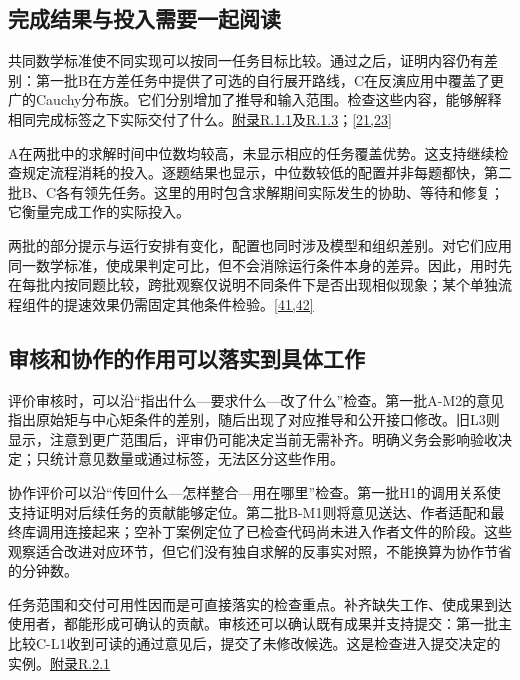 \subsection[完成结果与投入需要一起阅读]{\texorpdfstring{\protect\hypertarget{section-6-1}{}完成结果与投入需要一起阅读}{完成结果与投入需要一起阅读}}
共同数学标准使不同实现可以按同一任务目标比较。通过之后，证明内容仍有差别：第一批B在方差任务中提供了可选的自行展开路线，C在反演应用中覆盖了更广的Cauchy分布族。它们分别增加了推导和输入范围。检查这些内容，能够解释相同完成标签之下实际交付了什么。\href{zh-appendix.pdf\#r1-1}{附录R.1.1}及\href{zh-appendix.pdf\#r1-3}{R.1.3}；\hyperlink{ref-21}{\mbox{[21,23]}}

A在两批中的求解时间中位数均较高，未显示相应的任务覆盖优势。这支持继续检查规定流程消耗的投入。逐题结果也显示，中位数较低的配置并非每题都快，第二批B、C各有领先任务。这里的用时包含求解期间实际发生的协助、等待和修复；它衡量完成工作的实际投入。

两批的部分提示与运行安排有变化，配置也同时涉及模型和组织差别。对它们应用同一数学标准，使成果判定可比，但不会消除运行条件本身的差异。因此，用时先在每批内按同题比较，跨批观察仅说明不同条件下是否出现相似现象；某个单独流程组件的提速效果仍需固定其他条件检验。\hyperlink{ref-41}{\mbox{[41,42]}}

\subsection[审核和协作的作用可以落实到具体工作]{\texorpdfstring{\protect\hypertarget{section-6-2}{}审核和协作的作用可以落实到具体工作}{审核和协作的作用可以落实到具体工作}}
评价审核时，可以沿“指出什么—要求什么—改了什么”检查。第一批A-M2的意见指出原始矩与中心矩条件的差别，随后出现了对应推导和公开接口修改。旧L3则显示，注意到更广范围后，评审仍可能决定当前无需补齐。明确义务会影响验收决定；只统计意见数量或通过标签，无法区分这些作用。

协作评价可以沿“传回什么—怎样整合—用在哪里”检查。第一批H1的调用关系使支持证明对后续任务的贡献能够定位。第二批B-M1则将意见送达、作者适配和最终库调用连接起来；空补丁案例定位了已检查代码尚未进入作者文件的阶段。这些观察适合改进对应环节，但它们没有独自求解的反事实对照，不能换算为协作节省的分钟数。

任务范围和交付可用性因而是可直接落实的检查重点。补齐缺失工作、使成果到达使用者，都能形成可确认的贡献。审核还可以确认既有成果并支持提交：第一批主比较C-L1收到可读的通过意见后，提交了未修改候选。这是检查进入提交决定的实例。\href{zh-appendix.pdf\#r2-1}{附录R.2.1}

